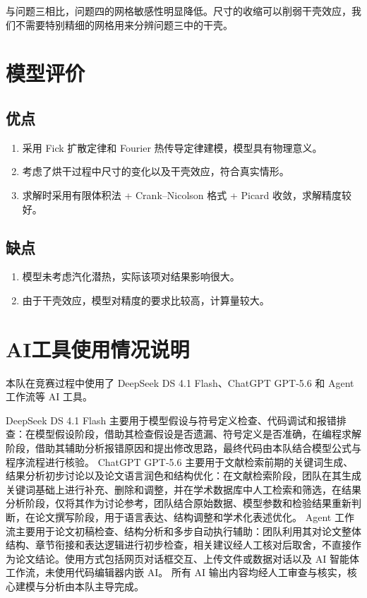 \documentclass[12pt,a4paper]{article}
\begin{document}
与问题三相比，问题四的网格敏感性明显降低。尺寸的收缩可以削弱干壳效应，我们不需要特别精细的网格用来分辨问题三中的干壳。








\section{模型评价}

\subsection{优点}
\begin{enumerate}
  \setlength{\itemsep}{0pt}
  \setlength{\parskip}{0pt}
  \setlength{\topsep}{2pt}
  \setlength{\partopsep}{0pt}
  \item 采用 Fick 扩散定律和 Fourier 热传导定律建模，模型具有物理意义。
  \item 考虑了烘干过程中尺寸的变化以及干壳效应，符合真实情形。
  \item 求解时采用有限体积法 + Crank--Nicolson 格式 + Picard 收敛，求解精度较好。
\end{enumerate}

\subsection{缺点}
\begin{enumerate}
  \setlength{\itemsep}{0pt}
  \setlength{\parskip}{0pt}
  \setlength{\topsep}{2pt}
  \setlength{\partopsep}{0pt}
  \item 模型未考虑汽化潜热，实际该项对结果影响很大。
  \item 由于干壳效应，模型对精度的要求比较高，计算量较大。
\end{enumerate}

\section*{AI工具使用情况说明}

本队在竞赛过程中使用了 DeepSeek DS 4.1 Flash、ChatGPT GPT-5.6 和 Agent 工作流等 AI 工具。

DeepSeek DS 4.1 Flash 主要用于模型假设与符号定义检查、代码调试和报错排查：在模型假设阶段，借助其检查假设是否遗漏、符号定义是否准确，在编程求解阶段，借助其辅助分析报错原因和提出修改思路，最终代码由本队结合模型公式与程序流程进行核验。
ChatGPT GPT-5.6 主要用于文献检索前期的关键词生成、结果分析初步讨论以及论文语言润色和结构优化：在文献检索阶段，团队在其生成关键词基础上进行补充、删除和调整，并在学术数据库中人工检索和筛选，在结果分析阶段，仅将其作为讨论参考，团队结合原始数据、模型参数和检验结果重新判断，在论文撰写阶段，用于语言表达、结构调整和学术化表述优化。
Agent 工作流主要用于论文初稿检查、结构分析和多步自动执行辅助：团队利用其对论文整体结构、章节衔接和表达逻辑进行初步检查，相关建议经人工核对后取舍，不直接作为论文结论。使用方式包括网页对话框交互、上传文件或数据对话以及 AI 智能体工作流，未使用代码编辑器内嵌 AI。
所有 AI 输出内容均经人工审查与核实，核心建模与分析由本队主导完成。
\end{document}
